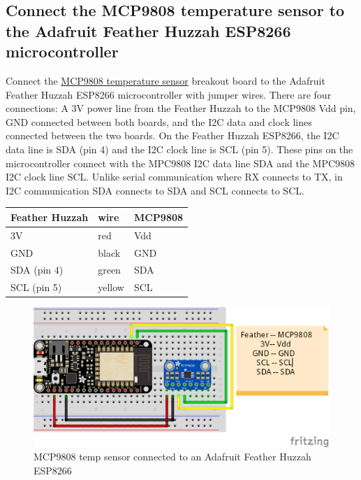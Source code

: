 \documentclass{book}
\makeatletter
\def\maxwidth{\ifdim\Gin@nat@width>\linewidth\linewidth
    \else\Gin@nat@width\fi}
\let\Oldincludegraphics\includegraphics
\renewcommand{\includegraphics}[1]{\Oldincludegraphics[width=.8\maxwidth]{#1}}
\makeatother
\begin{document}
    
        \subsection{Connect the MCP9808 temperature sensor to the Adafruit
Feather Huzzah ESP8266
microcontroller}\label{connect-the-mcp9808-temperature-sensor-to-the-adafruit-feather-huzzah-esp8266-microcontroller}
    




    
        Connect the \href{https://www.adafruit.com/product/1782}{MCP9808
temperature sensor} breakout board to the Adafruit Feather Huzzah
ESP8266 microcontroller with jumper wires. There are four connections: A
3V power line from the Feather Huzzah to the MCP9808 Vdd pin, GND
connected between both boards, and the I2C data and clock lines
connected between the two boards. On the Feather Huzzah ESP8266, the I2C
data line is SDA (pin 4) and the I2C clock line is SCL (pin 5). These
pins on the microcontroller connect with the MPC9808 I2C data line SDA
and the MPC9808 I2C clock line SCL. Unlike serial communication where RX
connects to TX, in I2C communication SDA connects to SDA and SCL
connects to SCL.

\begin{longtable}[]{@{}lll@{}}
\toprule
Feather Huzzah & wire & MCP9808\tabularnewline
\midrule
\endhead
3V & red & Vdd\tabularnewline
GND & black & GND\tabularnewline
SDA (pin 4) & green & SDA\tabularnewline
SCL (pin 5) & yellow & SCL\tabularnewline
\bottomrule
\end{longtable}

\begin{figure}
\centering
\includegraphics{images/feather_huzzah_temp_sensor_fritzing.png}
\caption{MCP9808 temp sensor connected to an Adafruit Feather Huzzah
ESP8266}
\end{figure}
    
\end{document}
